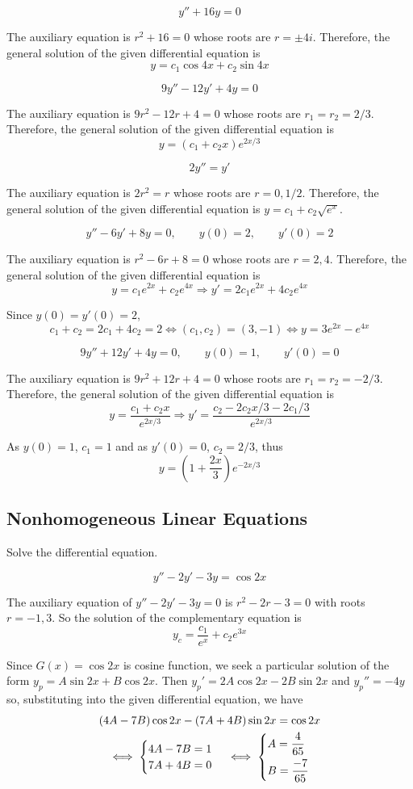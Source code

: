 \documentclass[a4paper,12pt]{article}
\begin{document}
\[y'' + 16y = 0\tag{3}\]

The auxiliary equation is $r^2 + 16 = 0$ whose roots are $r = \pm 4i$.
Therefore, the general solution of the given differential equation is
\[y = c_1\cos 4x + c_2\sin 4x\]

\[9y'' - 12y' + 4y = 0\tag{5}\]

The auxiliary equation is $9r^2 - 12r + 4 = 0$
whose roots are $r_1 = r_2 = 2/3$.
Therefore, the general solution of the given differential equation is
\[y = (c_1 + c_2 x)e^{2x/3}\]

\[2y'' = y'\tag{7}\]

The auxiliary equation is $2r^2 = r$ whose roots are $r = 0, 1/2$.
Therefore, the general solution of the given differential equation is
$y = c_1 + c_2\sqrt{e^x}$.

\[y'' - 6y' + 8y = 0,\qquad y(0) = 2,\qquad y'(0) = 2\tag{17}\]

The auxiliary equation is $r^2 - 6r + 8 = 0$ whose roots are $r = 2, 4$.
Therefore, the general solution of the given differential equation is
\[y = c_1 e^{2x} + c_2 e^{4x} \Longrightarrow y' = 2c_1 e^{2x} + 4c_2 e^{4x}\]

Since $y(0) = y'(0) = 2$,
\[c_1 + c_2 = 2c_1 + 4c_2 = 2 \iff (c_1, c_2) = (3, -1)
\iff y = 3e^{2x} - e^{4x}\]

\[9y'' + 12y' + 4y = 0,\qquad y(0) = 1,\qquad y'(0) = 0\tag{19}\]

The auxiliary equation is $9r^2 + 12r + 4 = 0$
whose roots are $r_1 = r_2 = -2/3$.
Therefore, the general solution of the given differential equation is
\[y = \frac{c_1 + c_2 x}{e^{2x/3}}
\Longrightarrow y' = \frac{c_2 - 2c_2 x/3 - 2c_1/3}{e^{2x/3}}\]

As $y(0) = 1$, $c_1 = 1$ and as $y'(0) = 0$, $c_2 = 2/3$, thus
\[y = \left(1 + \frac{2x}{3}\right)e^{-2x/3}\]

\subsection{Nonhomogeneous Linear Equations}
Solve the differential equation.

\[y'' - 2y' - 3y = \cos 2x\tag{1}\]

The auxiliary equation of $y'' - 2y' - 3y = 0$ is $r^2 - 2r - 3 = 0$
with roots $r = -1, 3$. So the solution of the complementary equation is
\[y_c = \frac{c_1}{e^x} + c_2 e^{3x}\]

Since $G(x) = \cos 2x$ is cosine function, we seek a particular solution
of the form $y_p = A\sin 2x + B\cos 2x$. Then $y_p' = 2A\cos 2x - 2B\sin 2x$
and $y_p'' = -4y$ so, substituting into the given differential equation,
we have
\begin{multline*}
  (4A - 7B)\cos 2x - (7A + 4B)\sin 2x = \cos 2x\\
\iff\begin{cases}
  4A - 7B = 1\\
  7A + 4B = 0
\end{cases}
\iff\begin{dcases}
  A = \frac{4}{65}\\
  B = \frac{-7}{65}
\end{dcases}
\end{multline*}
\end{document}
